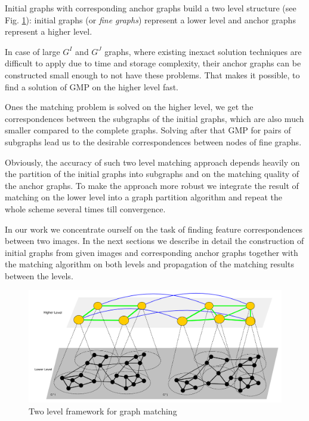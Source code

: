 Initial graphs with corresponding anchor graphs build a two level structure (see Fig. \ref{fig:2levels}): initial graphs (or \emph{fine graphs}) represent a lower level and anchor graphs represent a higher level.  

In case of large $G^I$ and $G^J$ graphs, where existing inexact solution techniques are difficult to apply due to time and storage complexity, their anchor graphs can be constructed small enough to not have these problems. That makes it possible, to find a solution of GMP on the higher level fast. 

Ones the matching problem is solved on the higher level, we get the correspondences between the subgraphs of the initial graphs, which are also much smaller compared to the complete graphs. Solving after that GMP for pairs of subgraphs lead us to the desirable correspondences between nodes of fine graphs.

Obviously, the accuracy of such two level matching approach depends heavily on the partition of the initial graphs into subgraphs and on the matching quality of the anchor graphs. To make the approach more robust we integrate the result of matching on the lower level into a graph partition algorithm and repeat the whole scheme several times till convergence.

In our work we concentrate ourself on the task of finding feature correspondences between two images. In the next sections we describe in detail the construction of initial graphs from given images and corresponding anchor graphs together with the matching algorithm on both levels and propagation of the matching results between the levels.

\begin{figure}
	\centering
	\includegraphics[scale=0.35]{chapter2/fig/twolevels.pdf}
	\caption{Two level framework for graph matching} \label{fig:2levels}
\end{figure}


